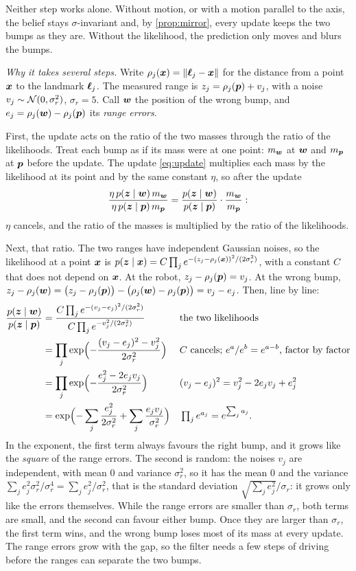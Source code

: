 Neither step works alone. Without motion, or with a motion parallel to
the axis, the belief stays $\sigma$-invariant and, by
\cref{prop:mirror}, every update keeps the two bumps as they are. Without
the likelihood, the prediction only moves and blurs the bumps.

\emph{Why it takes several steps.} Write $\rho_j(\bm{x})=
\left\lVert \bm{\ell}_j-\bm{x}\right\rVert$ for the distance from a point $\bm{x}$ to the
landmark $\bm{\ell}_j$. The measured range is $z_j=\rho_j(\bm{p})+v_j$, with a
noise $v_j\sim\mathcal{N}(0,\sigma_r^2)$, $\sigma_r=5$. Call $\bm{w}$ the
position of the wrong bump, and $e_j=\rho_j(\bm{w})-\rho_j(\bm{p})$ its
\emph{range errors}.

First, the update acts on the ratio of the two masses through the ratio
of the likelihoods. Treat each bump as if its mass were at one point: $m_{\bm{w}}$
at $\bm{w}$ and $m_{\bm{p}}$ at $\bm{p}$ before the update. The update
\eqref{eq:update} multiplies each mass by the likelihood at its point and
by the same constant $\eta$, so after the update
\[
  \frac{\eta\,p(\bm{z}\mid\bm{w})\,m_{\bm{w}}}{\eta\,p(\bm{z}\mid\bm{p})\,m_{\bm{p}}}
  =\frac{p(\bm{z}\mid\bm{w})}{p(\bm{z}\mid\bm{p})}\cdot\frac{m_{\bm{w}}}{m_{\bm{p}}} :
\]
$\eta$ cancels, and the ratio of the masses is multiplied by the ratio of
the likelihoods.

Next, that ratio. The two ranges have independent Gaussian noises, so the
likelihood at a point $\bm{x}$ is
$p(\bm{z}\mid\bm{x})=C\prod_je^{-(z_j-\rho_j(\bm{x}))^2/(2\sigma_r^2)}$,
with a constant $C$ that does not depend on $\bm{x}$. At the robot,
$z_j-\rho_j(\bm{p})=v_j$. At the wrong bump,
$z_j-\rho_j(\bm{w})=\bigl(z_j-\rho_j(\bm{p})\bigr)-\bigl(\rho_j(\bm{w})
-\rho_j(\bm{p})\bigr)=v_j-e_j$. Then, line by line:
\begin{align*}
  \frac{p(\bm{z}\mid\bm{w})}{p(\bm{z}\mid\bm{p})}
  &=\frac{C\prod_je^{-(v_j-e_j)^2/(2\sigma_r^2)}}
         {C\prod_je^{-v_j^2/(2\sigma_r^2)}}
  &&\text{the two likelihoods}\\
  &=\prod_j\exp\Bigl(-\frac{(v_j-e_j)^2-v_j^2}{2\sigma_r^2}\Bigr)
  &&\text{$C$ cancels; $e^a/e^b=e^{a-b}$, factor by factor}\\
  &=\prod_j\exp\Bigl(-\frac{e_j^2-2e_jv_j}{2\sigma_r^2}\Bigr)
  &&(v_j-e_j)^2=v_j^2-2e_jv_j+e_j^2\\
  &=\exp\Bigl(-\sum_j\frac{e_j^2}{2\sigma_r^2}
   +\sum_j\frac{e_jv_j}{\sigma_r^2}\Bigr)
  &&\textstyle\prod_je^{a_j}=e^{\sum_ja_j}.
\end{align*}
In the exponent, the first term always favours
the right bump, and it grows like the \emph{square} of the range errors.
The second is random: the noises $v_j$ are independent, with mean $0$
and variance $\sigma_r^2$, so it has the mean $0$ and the variance
$\sum_je_j^2\sigma_r^2/\sigma_r^4=\sum_je_j^2/\sigma_r^2$, that is the
standard deviation $\sqrt{\sum_je_j^2}/\sigma_r$: it grows only like the
errors themselves.
While the range errors are smaller than $\sigma_r$, both terms are small,
and the second can favour either bump. Once they are larger than
$\sigma_r$, the first term wins, and the wrong bump loses most of its mass
at every update. The range errors grow with the gap, so the filter needs
a few steps of driving before the ranges can separate the two bumps.

